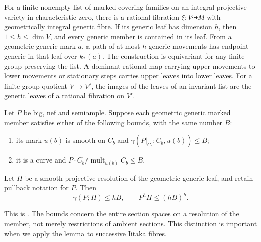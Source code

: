 \begin{lemma}
\label{lem:chain-input}
For a finite nonempty list of marked covering families on an integral
projective variety in characteristic zero, there is a rational
fibration $\xi:V\dashrightarrow M$ with geometrically integral
generic fibre.  If its generic leaf has dimension $h$, then
$1\le h\le\dim V$, and every generic member is contained in its
leaf.  From a geometric generic mark $a$, a path of at most $h$
generic movements has endpoint generic in that leaf over
$\overline{k_*(a)}$.
The construction is equivariant for any finite group preserving the
list.  A dominant rational map carrying upper movements to lower
movements or stationary steps carries upper leaves into lower leaves.
For a finite group quotient $V\to V'$, the images of the leaves of
an invariant list are the generic leaves of a rational fibration on
$V'$.

Let $P$ be big, nef and semiample.  Suppose each geometric generic
marked member satisfies either of the following bounds, with the
same number $B$:
\begin{enumerate}
\item its mark $u(b)$ is smooth on $C_b$ and
$\gamma(P|_{C_b};C_b,u(b))\le B$;
\item it is a curve and
$P\cdot C_b/\operatorname{mult}_{u(b)}C_b\le B$.
\end{enumerate}
Let $H$ be a smooth projective resolution of the geometric generic
leaf, and retain pullback notation for $P$.  Then
\begin{equation}\label{eq:chain-input-bounds}
                         \gamma(P;H)\le hB,
                         \qquad P^hH\le(hB)^h.
\end{equation}
\end{lemma}

This is \cite[Lemmas 5.1 and 5.4 and Corollary 5.2]{U4}.
The bounds concern the entire section spaces on a resolution of the
member, not merely restrictions of ambient sections.  This distinction
is important when we apply the lemma to successive Iitaka fibres.

